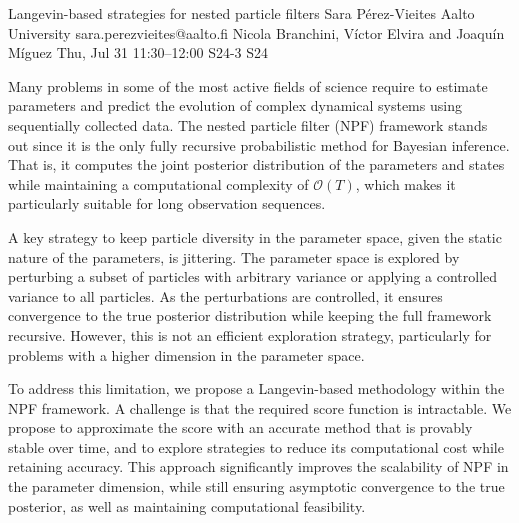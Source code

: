 \begin{talk}
  {Langevin-based strategies for nested particle filters}%
  {Sara Pérez-Vieites}%
  {Aalto University}%
  {sara.perezvieites@aalto.fi}%
  {Nicola Branchini, Víctor Elvira and Joaquín Míguez}%
  {}%
  {Thu, Jul 31 11:30–12:00}%
  {S24-3}%
  {S24}%
  
				
			
Many problems in some of the most active fields of science require to estimate parameters and predict the evolution of complex dynamical systems using sequentially collected data. The nested particle filter (NPF) framework stands out since it is the only fully recursive probabilistic method for Bayesian inference. That is, it computes the joint posterior distribution of the parameters and states while maintaining a computational complexity of $\mathcal{O}(T)$, which makes it particularly suitable for long observation sequences. 

A key strategy to keep particle diversity in the parameter space, given the static nature of the parameters, is jittering. The parameter space is explored by perturbing a subset of particles with arbitrary variance or applying a controlled variance to all particles. As the perturbations are controlled, it ensures convergence to the true posterior distribution while keeping the full framework recursive. However, this is not an efficient exploration strategy, particularly for problems with a higher dimension in the parameter space.

To address this limitation, we propose a Langevin-based methodology within the NPF framework. A challenge is that the required score function is intractable. We propose to approximate the score with an accurate method that is provably stable over time, and to explore strategies to reduce its computational cost while retaining accuracy.
This approach significantly improves the scalability of NPF in the parameter dimension, while still ensuring asymptotic convergence to the true posterior, as well as maintaining computational feasibility.

\medskip



\end{talk}

